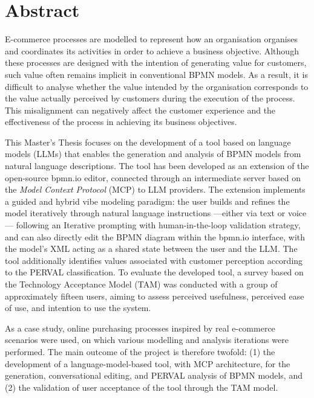 \newpage

\chapter*{Abstract}

E-commerce processes are modelled to represent how an organisation organises and coordinates its activities in order to achieve a business objective. Although these processes are designed with the intention of generating value for customers, such value often remains implicit in conventional BPMN models. As a result, it is difficult to analyse whether the value intended by the organisation corresponds to the value actually perceived by customers during the execution of the process. This misalignment can negatively affect the customer experience and the effectiveness of the process in achieving its business objectives.

This Master's Thesis focuses on the development of a tool based on language models (LLMs) that enables the generation and analysis of BPMN models from natural language descriptions. The tool has been developed as an extension of the open-source bpmn.io editor, connected through an intermediate server based on the \textit{Model Context Protocol} (MCP) to LLM providers. The extension implements a guided and hybrid vibe modeling paradigm: the user builds and refines the model iteratively through natural language instructions ---either via text or voice--- following an Iterative prompting with human-in-the-loop validation strategy, and can also directly edit the BPMN diagram within the bpmn.io interface, with the model's XML acting as a shared state between the user and the LLM. The tool additionally identifies values associated with customer perception according to the PERVAL classification. To evaluate the developed tool, a survey based on the Technology Acceptance Model (TAM) was conducted with a group of approximately fifteen users, aiming to assess perceived usefulness, perceived ease of use, and intention to use the system.

As a case study, online purchasing processes inspired by real e-commerce scenarios were used, on which various modelling and analysis iterations were performed. The main outcome of the project is therefore twofold: (1) the development of a language-model-based tool, with MCP architecture, for the generation, conversational editing, and PERVAL analysis of BPMN models, and (2) the validation of user acceptance of the tool through the TAM model.


